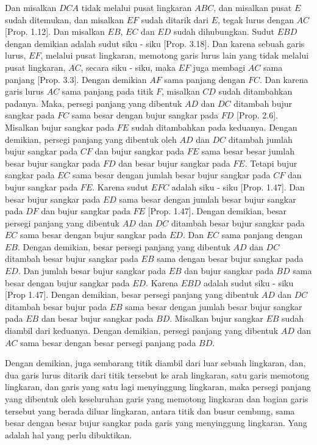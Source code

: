 \documentclass[a4paper]{book}
\begin{document}
Dan misalkan $DCA$ tidak melalui pusat lingkaran $ABC$, dan misalkan pusat $E$
sudah ditemukan, dan misalkan $EF$ sudah ditarik dari $E$, tegak lurus dengan
$AC$ [Prop. 1.12]. Dan misalkan $EB$, $EC$ dan $ED$ sudah dihubungkan. Sudut
$EBD$ dengan demikian adalah sudut siku - siku [Prop. 3.18]. Dan karena sebuah
garis lurus, $EF$, melalui pusat lingkaran, memotong garis lurus lain yang tidak
melalui pusat lingkaran, $AC$, secara siku - siku, maka $EF$ juga membagi $AC$
sama panjang [Prop. 3.3]. Dengan demikian $AF$ sama panjang dengan $FC$. Dan
karena garis lurus $AC$ sama panjang pada titik $F$, misalkan $CD$ sudah 
ditambahkan padanya. Maka, persegi panjang yang dibentuk $AD$ dan $DC$ ditambah
bujur sangkar pada $FC$ sama besar dengan bujur sangkar pada $FD$ [Prop. 2.6]. 
Misalkan bujur sangkar pada $FE$ sudah ditambahkan pada keduanya. Dengan 
demikian, persegi panjang yang dibentuk oleh $AD$ dan $DC$ ditambah jumlah
bujur sangkar pada $CF$ dan bujur sangkar pada $FE$ sama besar besar jumlah
besar bujur sangkar pada $FD$ dan besar bujur sangkar pada $FE$. Tetapi
bujur sangkar pada $EC$ sama besar dengan jumlah besar bujur sangkar pada 
$CF$ dan bujur sangkar pada $FE$. Karena sudut $EFC$ adalah siku - siku
[Prop. 1.47]. Dan besar bujur sangkar pada $ED$ sama besar dengan jumlah
besar bujur sangkar pada  $DF$ dan bujur sangkar pada $FE$ [Prop. 1.47].
Dengan demikian, besar persegi panjang yang dibentuk $AD$ dan $DC$ ditambah
besar bujur sangkar pada $EC$ sama besar dengan bujur sangkar pada $ED$.
Dan $EC$ sama panjang dengan $EB$. Dengan demikian, besar persegi panjang
yang dibentuk $AD$ dan $DC$ ditambah besar bujur sangkar pada $EB$ sama dengan 
besar bujur sangkar pada $ED$. Dan jumlah besar bujur sangkar pada $EB$ dan
bujur sangkar pada $BD$ sama besar dengan bujur sangkar pada $ED$. Karena $EBD$
adalah sudut siku - siku [Prop 1.47]. Dengan demikian, besar persegi panjang yang
dibentuk $AD$ dan $DC$ ditambah besar bujur pada $EB$ sama besar dengan jumlah 
besar bujur sangkar pada $EB$ dan besar bujur sangkar pada $BD$. Misalkan bujur
sangkar $EB$ sudah diambil dari keduanya. Dengan demikian, persegi panjang yang
dibentuk $AD$ dan $AC$ sama besar dengan besar persegi panjang pada  $BD$.

Dengan demikian, juga sembarang titik diambil dari luar sebuah lingkaran, dan, 
dua garis lurus ditarik dari titik tersebut ke arah lingkaran, satu garis memotong
lingkaran, dan garis yang satu lagi menyinggung lingkaran, maka persegi panjang
yang dibentuk oleh keseluruhan garis yang memotong lingkaran dan bagian garis 
tersebut yang berada diluar lingkaran, antara titik dan busur cembung, sama 
besar dengan besar bujur sangkar pada garis yang menyinggung lingkaran. Yang
adalah hal yang perlu dibuktikan.
\end{document}
